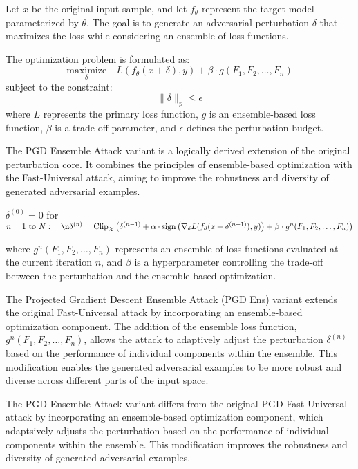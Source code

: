 Let $x$ be the original input sample, and let $f_{\theta}$ represent the target model parameterized by \(\theta\). The goal is to generate an adversarial perturbation \(\delta\) that maximizes the loss while considering an ensemble of loss functions.  

The optimization problem is formulated as:  
\[
\underset{\delta}{\text{maximize}} \quad L(f_{\theta}(x + \delta), y) + \beta \cdot g(F_1, F_2, \dots, F_n)
\]
subject to the constraint:  
\[
\|\delta\|_p \leq \epsilon
\]
where \(L\) represents the primary loss function, \(g\) is an ensemble-based loss function, \(\beta\) is a trade-off parameter, and \(\epsilon\) defines the perturbation budget.


The PGD Ensemble Attack variant is a logically derived extension of the original perturbation core. It combines the principles of ensemble-based optimization with the Fast-Universal attack, aiming to improve the robustness and diversity of generated adversarial examples.

$\delta^{(0)} = 0$
for $n = 1 \text{ to } N: \quad\n\delta^{(n)} = \text{Clip}_{\mathcal{X}} \left( \delta^{(n-1)} + \alpha \cdot \text{sign} \left( \nabla_\delta L(f_\theta(x + \delta^{(n-1)}), y) \right) + \beta \cdot g^n(F_1, F_2, \dots, F_n) \right)$

where $g^n(F_1, F_2, \dots, F_n)$ represents an ensemble of loss functions evaluated at the current iteration $n$, and $\beta$ is a hyperparameter controlling the trade-off between the perturbation and the ensemble-based optimization.

The Projected Gradient Descent Ensemble Attack (PGD Ens) variant extends the original Fast-Universal attack by incorporating an ensemble-based optimization component. The addition of the ensemble loss function, $g^n(F_1, F_2, \dots, F_n)$, allows the attack to adaptively adjust the perturbation $\delta^{(n)}$ based on the performance of individual components within the ensemble. This modification enables the generated adversarial examples to be more robust and diverse across different parts of the input space.

The PGD Ensemble Attack variant differs from the original PGD Fast-Universal attack by incorporating an ensemble-based optimization component, which adaptsively adjusts the perturbation based on the performance of individual components within the ensemble. This modification improves the robustness and diversity of generated adversarial examples.